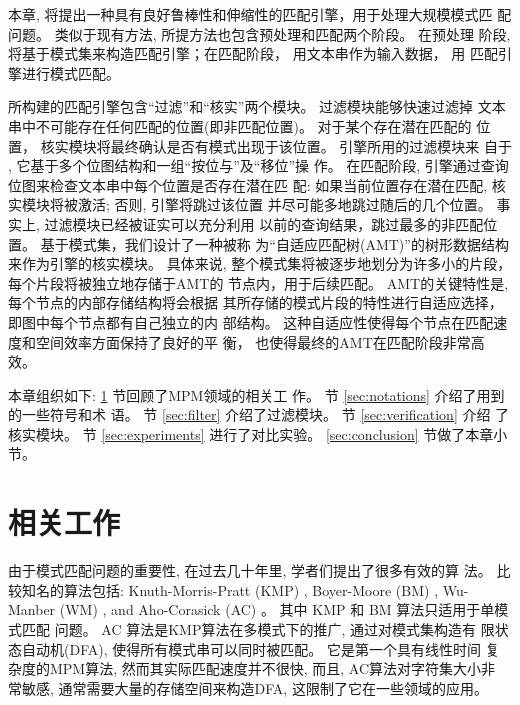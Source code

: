 本章, 将提出一种具有良好鲁棒性和伸缩性的匹配引擎，用于处理大规模模式匹
配问题。 类似于现有方法, 所提方法也包含预处理和匹配两个阶段。 在预处理
阶段,将基于模式集来构造匹配引擎；在匹配阶段， 用文本串作为输入数据， 用
匹配引擎进行模式匹配。


所构建的匹配引擎包含“过滤”和“核实”两个模块。 过滤模块能够快速过滤掉
文本串中不可能存在任何匹配的位置(即非匹配位置)。 对于某个存在潜在匹配的
位置， 核实模块将最终确认是否有模式出现于该位置。 引擎所用的过滤模块来
自于 \cite{Lee2013}, 它基于多个位图结构和一组“按位与”及“移位”操
作。 在匹配阶段, 引擎通过查询位图来检查文本串中每个位置是否存在潜在匹
配: 如果当前位置存在潜在匹配, 核实模块将被激活; 否则, 引擎将跳过该位置
并尽可能多地跳过随后的几个位置。 事实上, 过滤模块已经被证实可以充分利用
以前的查询结果，跳过最多的非匹配位置。 基于模式集，我们设计了一种被称
为“自适应匹配树(AMT)”的树形数据结构来作为引擎的核实模块。 具体来说,
整个模式集将被逐步地划分为许多小的片段， 每个片段将被独立地存储于AMT的
节点内，用于后续匹配。 AMT的关键特性是, 每个节点的内部存储结构将会根据
其所存储的模式片段的特性进行自适应选择，即图中每个节点都有自己独立的内
部结构。 这种自适应性使得每个节点在匹配速度和空间效率方面保持了良好的平
衡， 也使得最终的AMT在匹配阶段非常高效。

本章组织如下: \ref{sec:related works} 节回顾了MPM领域的相关工
作。 节 \ref{sec:notations} 介绍了用到的一些符号和术
语。 节 \ref{sec:filter} 介绍了过滤模块。 节 \ref{sec:verification} 介绍
了核实模块。 节 \ref{sec:experiments} 进行了对比实验。
\ref{sec:conclusion} 节做了本章小节。

\section{相关工作}
\label{sec:related works}

由于模式匹配问题的重要性, 在过去几十年里, 学者们提出了很多有效的算
法。 比较知名的算法包括: Knuth-Morris-Pratt (\textsf{KMP})
\cite{Knuth1977}, Boyer-Moore (\textsf{BM}) \cite{Boyer1977},
Wu-Manber (\textsf{WM}) \cite{Wu1994}, and Aho-Corasick (\textsf{AC})
\cite{Aho1975}。 其中 \textsf{KMP} 和 \textsf{BM} 算法只适用于单模式匹配
问题。  \textsf{AC} 算法是KMP算法在多模式下的推广, 通过对模式集构造有
限状态自动机(DFA), 使得所有模式串可以同时被匹配。 它是第一个具有线性时间
复杂度的MPM算法, 然而其实际匹配速度并不很快, 而且, AC算法对字符集大小非
常敏感, 通常需要大量的存储空间来构造DFA, 这限制了它在一些领域的应用。

